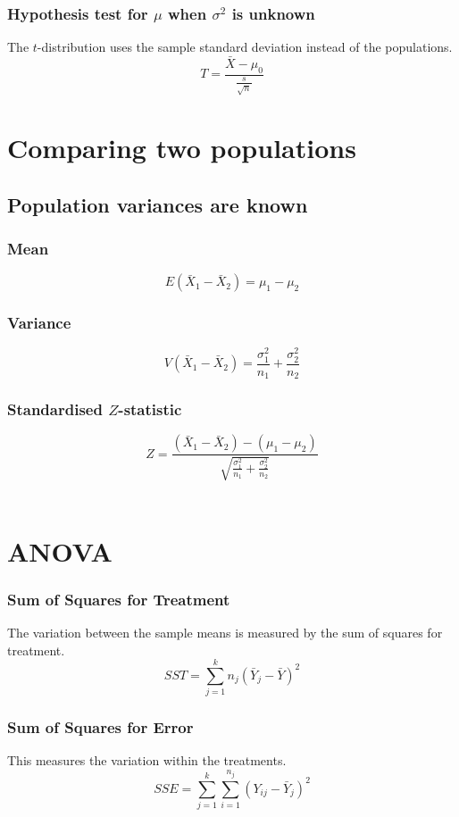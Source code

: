\documentclass{article}
\begin{document}
\subsubsection{Hypothesis test for $\mu$ when $\sigma^2$ is unknown}
The $t$-distribution uses the sample standard deviation instead of the populations.
$$
T = \frac{\bar{X} - \mu_0}{\frac{s}{\sqrt{n}}}
$$


\section{Comparing two populations}

\subsection{Population variances are known}

\subsubsection{Mean}
$$
E(\bar{X}_1 - \bar{X}_2) = \mu_1 - \mu_2
$$

\subsubsection{Variance}
$$
V(\bar{X}_1 - \bar{X}_2) = \frac{\sigma^2_1}{n_1} + \frac{\sigma^2_2}{n_2}
$$

\subsubsection{Standardised $Z$-statistic}
$$
Z = \frac{(\bar{X}_1 - \bar{X}_2) - (\mu_1 - \mu_2)}{\sqrt{\frac{\sigma^2_1}{n_1}+\frac{\sigma^2_2}{n_2}}}
$$
\\

\pagebreak

\section{ANOVA}

\subsubsection{Sum of Squares for Treatment}
The variation between the sample means is measured by the sum of squares for treatment.
$$
SST = \sum_{j=1}^k n_j(\bar{Y}_j - \bar{Y})^2
$$


\subsubsection{Sum of Squares for Error}
This measures the variation within the treatments.
$$
SSE = \sum_{j=1}^k \sum_{i=1}^{n_j} (Y_{ij} - \bar{Y}_j)^2
$$
\end{document}
